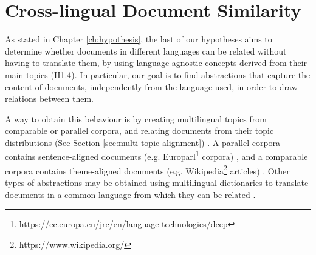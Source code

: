 

\chapter{Cross-lingual Document Similarity}\label{ch:multilinguality}

\graphicspath{{multilinguality/figures/}}



As stated in Chapter \ref{ch:hypothesis}, the last of our hypotheses aims to determine whether documents in different languages can be related without having to translate them, by using language agnostic concepts derived from their main topics (H1.4). In particular, our goal is to find abstractions that capture the content of documents, independently from the language used, in order to draw relations between them. 

A way to obtain this behaviour is by creating multilingual topics from comparable or parallel corpora, and relating documents from their topic distributions (See Section \ref{sec:multi-topic-alignment}) \citep{Graber2009, Boyd-Graber2010, Vulic2015}. A parallel corpora contains sentence-aligned documents (e.g. Europarl\footnote{https://ec.europa.eu/jrc/en/language-technologies/dcep} corpora) \citep{Steinberger2014}, and a comparable corpora contains theme-aligned documents (e.g. Wikipedia\footnote{https://www.wikipedia.org/} articles) \citep{Ni2009, Ni:2011:CLT:1935826.1935887}. Other types of abstractions may be obtained using multilingual dictionaries to translate documents in a common language from which they can be related \citep{errez2016, Liu2015a, Ma2017}. 

